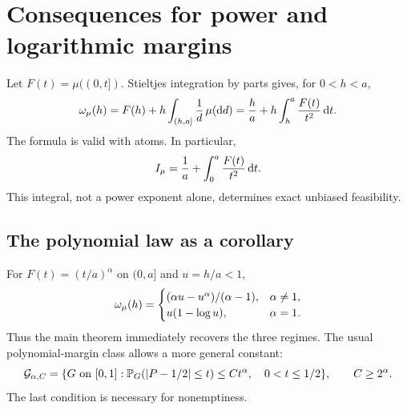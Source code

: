 

\section{Consequences for power and logarithmic margins}\label{sec:rates}
Let $F(t)=\mu((0,t])$. Stieltjes integration by parts gives, for $0<h<a$,
\begin{equation}\label{eq:cdf-formula}
 \omega_\mu(h)=F(h)+h\int_{(h,a]}\frac1d\,\mu(\mathrm d d)
       =\frac ha+h\int_h^a\frac{F(t)}{t^2}\,\mathrm dt.
\end{equation}
The formula is valid with atoms. In particular,
\begin{equation}\label{eq:cdf-integrability}
 I_\mu=\frac1a+\int_0^a\frac{F(t)}{t^2}\,\mathrm dt.
\end{equation}
This integral, not a power exponent alone, determines exact unbiased
feasibility.

\subsection{The polynomial law as a corollary}
For $F(t)=(t/a)^\alpha$ on $(0,a]$ and $u=h/a<1$,
\begin{equation}\label{eq:power-modulus}
 \omega_\mu(h)=
 \begin{cases}
  (\alpha u-u^\alpha)/(\alpha-1),&\alpha\ne1,\\
  u(1-\log u),&\alpha=1.
 \end{cases}
\end{equation}
Thus the main theorem immediately recovers the three regimes.
The usual polynomial-margin class allows a more general constant:
\begin{equation}\label{eq:power-class}
 \mathcal G_{\alpha,C}=\{G\text{ on }[0,1]:
  \mathbb P_G(|P-1/2|\le t)\le Ct^\alpha,\quad0<t\le1/2\},
 \qquad C\ge2^\alpha.
\end{equation}
The last condition is necessary for nonemptiness.

